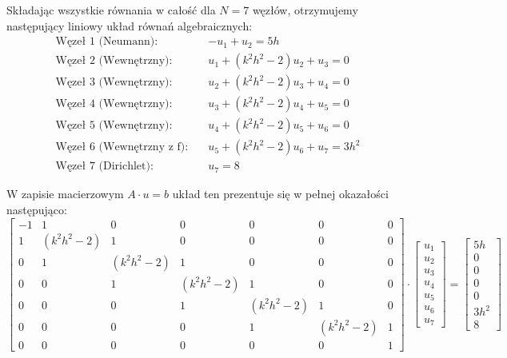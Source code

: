 \documentclass[a4paper,14pt]{scrartcl}
\begin{document}
Składając wszystkie równania w całość dla $N=7$ węzłów, otrzymujemy następujący liniowy układ równań algebraicznych:
\begin{align*}
    \text{Węzeł 1 (Neumann):} \quad        & -u_1 + u_2 = 5h                    \\
    \text{Węzeł 2 (Wewnętrzny):} \quad     & u_1 + (k^2h^2 - 2)u_2 + u_3 = 0    \\
    \text{Węzeł 3 (Wewnętrzny):} \quad     & u_2 + (k^2h^2 - 2)u_3 + u_4 = 0    \\
    \text{Węzeł 4 (Wewnętrzny):} \quad     & u_3 + (k^2h^2 - 2)u_4 + u_5 = 0    \\
    \text{Węzeł 5 (Wewnętrzny):} \quad     & u_4 + (k^2h^2 - 2)u_5 + u_6 = 0    \\
    \text{Węzeł 6 (Wewnętrzny z f):} \quad & u_5 + (k^2h^2 - 2)u_6 + u_7 = 3h^2 \\
    \text{Węzeł 7 (Dirichlet):} \quad      & u_7 = 8
\end{align*}

W zapisie macierzowym $A \cdot u = b$ układ ten prezentuje się w pełnej okazałości następująco:
\begin{equation}
    \begin{bmatrix}
        -1 & 1          & 0          & 0          & 0          & 0          & 0 \\
        1  & (k^2h^2-2) & 1          & 0          & 0          & 0          & 0 \\
        0  & 1          & (k^2h^2-2) & 1          & 0          & 0          & 0 \\
        0  & 0          & 1          & (k^2h^2-2) & 1          & 0          & 0 \\
        0  & 0          & 0          & 1          & (k^2h^2-2) & 1          & 0 \\
        0  & 0          & 0          & 0          & 1          & (k^2h^2-2) & 1 \\
        0  & 0          & 0          & 0          & 0          & 0          & 1
    \end{bmatrix}
    \cdot
    \begin{bmatrix}
        u_1 \\ u_2 \\ u_3 \\ u_4 \\ u_5 \\ u_6 \\ u_7
    \end{bmatrix}
    =
    \begin{bmatrix}
        5h \\ 0 \\ 0 \\ 0 \\ 0 \\ 3h^2 \\ 8
    \end{bmatrix}
\end{equation}
\end{document}
